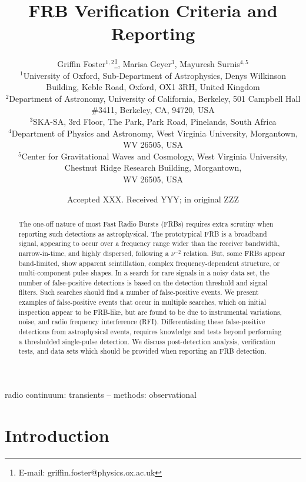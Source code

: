 \documentclass[a4paper,fleqn,usenatbib]{mnras}
\title[FRB Verification Criteria and Reporting]{FRB Verification Criteria and Reporting}
\author[G. Foster et al.]{
Griffin Foster$^{1,2}$\thanks{E-mail: griffin.foster@physics.ox.ac.uk},
Marisa Geyer$^{3}$,
Mayuresh Surnis$^{4,5}$
\\
$^{1}$University of Oxford, Sub-Department of Astrophysics, Denys Wilkinson Building, Keble Road, Oxford, OX1 3RH, United Kingdom\\
$^{2}$Department of Astronomy, University of California, Berkeley, 501 Campbell
Hall \#3411, Berkeley, CA, 94720, USA\\
$^{3}$SKA-SA, 3rd Floor, The Park, Park Road, Pinelands, South Africa\\
$^{4}$Department of Physics and Astronomy, West Virginia University, Morgantown, WV 26505, USA\\
$^{5}$Center for Gravitational Waves and Cosmology, West Virginia University, Chestnut Ridge Research Building, Morgantown,\\ WV 26505, USA\\
}
\date{Accepted XXX. Received YYY; in original ZZZ}
\begin{document}
\label{firstpage}
\pagerange{\pageref{firstpage}--\pageref{lastpage}}
\maketitle


\begin{abstract}
The one-off nature of most Fast Radio Bursts (FRBs) requires extra scrutiny when
reporting such detections as astrophysical.  The prototypical FRB is a broadband
signal, appearing to occur over a frequency range wider than the receiver
bandwidth, narrow-in-time, and highly dispersed, following a $\nu^{-2}$
relation.  But, some FRBs appear band-limited, show apparent scintillation,
complex frequency-dependent structure, or multi-component pulse shapes.  In a
search for rare signals in a noisy data set, the number of false-positive
detections is based on the detection threshold and signal filters.  Such
searches should find a number of false-positive events.  We present examples of
false-positive events that occur in multiple searches, which on initial
inspection appear to be FRB-like, but are found to be due to instrumental
variations, noise, and radio frequency interference (RFI).  Differentiating
these false-positive detections from astrophysical events, requires knowledge
and tests beyond performing a thresholded single-pulse detection.  We discuss
post-detection analysis, verification tests, and data sets which should be
provided when reporting an FRB detection.
\end{abstract}

\begin{keywords}
radio continuum: transients -- methods: observational
\end{keywords}


\section{Introduction}
\label{sec:intro}
\end{document}
